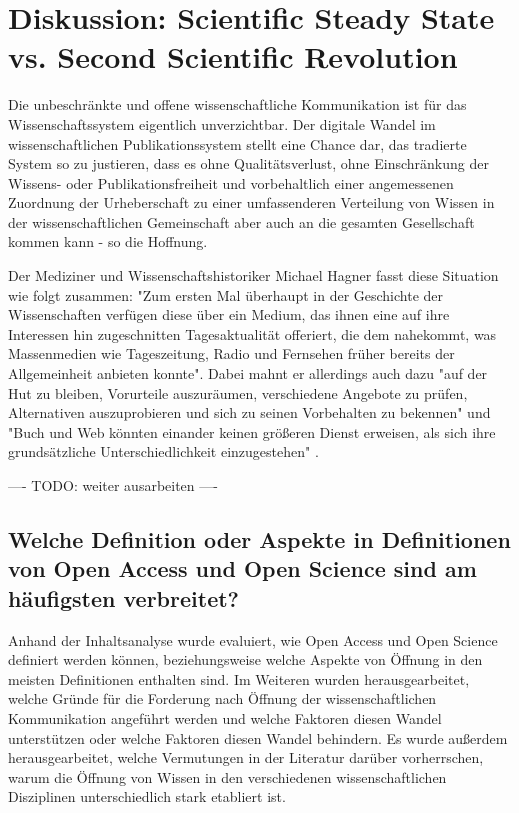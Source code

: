 \chapter{Diskussion: Scientific Steady State vs. Second Scientific Revolution}

Die unbeschränkte und offene wissenschaftliche Kommunikation ist für das Wissenschaftssystem eigentlich unverzichtbar. Der digitale Wandel im wissenschaftlichen Publikationssystem stellt eine Chance dar, das tradierte System so zu justieren, dass es ohne Qualitätsverlust, ohne Einschränkung der Wissens- oder Publikationsfreiheit und vorbehaltlich einer angemessenen Zuordnung der Urheberschaft zu einer umfassenderen Verteilung von Wissen in der wissenschaftlichen Gemeinschaft aber auch an die gesamten Gesellschaft kommen kann - so die Hoffnung.

Der Mediziner und Wissenschaftshistoriker Michael Hagner fasst diese Situation wie folgt zusammen: "Zum ersten Mal überhaupt in der Geschichte der Wissenschaften verfügen diese über ein Medium, das ihnen eine auf ihre Interessen hin zugeschnitten Tagesaktualität offeriert, die dem nahekommt, was Massenmedien wie Tageszeitung, Radio und Fernsehen früher bereits der Allgemeinheit anbieten konnte". Dabei mahnt er allerdings auch dazu "auf der Hut zu bleiben, Vorurteile auszuräumen, verschiedene Angebote zu prüfen, Alternativen auszuprobieren und sich zu seinen Vorbehalten zu bekennen" und "Buch und Web könnten einander keinen größeren Dienst erweisen, als sich ihre grundsätzliche Unterschiedlichkeit einzugestehen" \cite{hagner_2015_sache_buches}.

---- TODO: weiter ausarbeiten ----

\section{Welche Definition oder Aspekte in Definitionen von Open Access und Open Science sind am häufigsten verbreitet?}

Anhand der Inhaltsanalyse wurde evaluiert, wie Open Access und Open Science definiert werden können, beziehungsweise welche Aspekte von Öffnung in den meisten Definitionen enthalten sind. Im Weiteren wurden herausgearbeitet, welche Gründe für die Forderung nach Öffnung der wissenschaftlichen Kommunikation angeführt werden und welche Faktoren diesen Wandel unterstützen oder welche Faktoren diesen Wandel behindern. Es wurde außerdem herausgearbeitet, welche Vermutungen in der Literatur darüber vorherrschen, warum die Öffnung von Wissen in den verschiedenen wissenschaftlichen Disziplinen unterschiedlich stark etabliert ist.

